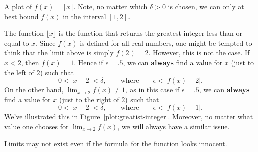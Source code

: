\begin{marginfigure}[0in]
\caption{A plot of $f(x)=\lfloor x\rfloor$. Note, no matter which
  $\delta>0$ is chosen, we can only at best bound $f(x)$ in the
  interval $[1,2]$.}
\label{plot:greatist-integer}
\end{marginfigure}
\begin{solution}
The function $\lfloor x \rfloor$ is the function that returns the
greatest integer less than or equal to $x$. Since $f(x)$ is defined
for all real numbers, one might be tempted to think that the limit
above is simply $f(2) = 2$. However, this is not the case.  If $x<2$,
then $f(x) =1$. Hence if $\epsilon = .5$, we can \textbf{always} find
a value for $x$ (just to the left of $2$) such that
\[
0< |x -2|< \delta, \qquad\text{where} \qquad \epsilon < |f(x)-2|.
\]
On the other hand, $\lim_{x\to 2} f(x)\ne 1$, as in this case if
$\epsilon=.5$, we can \textbf{always} find a value for $x$ (just to
the right of $2$) such that
\[
0<|x- 2|<\delta, \qquad\text{where} \qquad  \epsilon<|f(x)-1|.
\]
We've illustrated this in
Figure~\ref{plot:greatist-integer}. Moreover, no matter what value one
chooses for $\lim_{x\to 2} f(x)$, we will always have a similar
issue.
\end{solution}



Limits may not exist even if the formula for the function looks
innocent.

